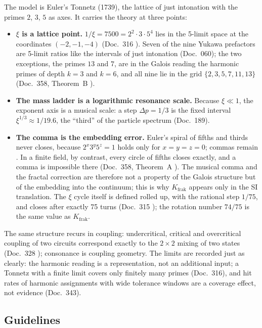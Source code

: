 The model is Euler's Tonnetz (1739), the lattice of just intonation with the primes $2$, $3$, $5$
as axes. It carries the theory at three points:
\begin{itemize}[leftmargin=*,itemsep=2pt]
\item \textbf{$\xi$ is a lattice point.} $1/\xi=7500=2^2\cdot3\cdot5^4$ lies in the 5-limit space
  at the coordinates $(-2,-1,-4)$ (Doc.~316 \KM). Seven of the nine Yukawa prefactors are 5-limit
  ratios like the intervals of just intonation (Doc.~060); the two exceptions, the primes $13$
  and $7$, are in the Galois reading the harmonic primes of depth $k=3$ and $k=6$, and all nine
  lie in the grid $\{2,3,5,7,11,13\}$ (Doc.~358, Theorem~B \BM).
\item \textbf{The mass ladder is a logarithmic resonance scale.} Because $\xi\ll1$, the exponent
  axis is a musical scale: a step $\Delta p=1/3$ is the fixed interval $\xi^{1/3}\approx1/19.6$,
  the ``third'' of the particle spectrum (Doc.~189).
\item \textbf{The comma is the embedding error.} Euler's spiral of fifths and thirds never
  closes, because $2^x3^y5^z=1$ holds only for $x=y=z=0$; commas remain \QM. In a finite field,
  by contrast, every circle of fifths closes exactly, and a comma is impossible there (Doc.~358,
  Theorem~A \BM). The musical comma and the fractal correction are therefore not a property of
  the Galois structure but of the embedding into the continuum; this is why $K_{\text{frak}}$
  appears only in the SI translation. The $\xi$ cycle itself is defined rolled up, with the
  rational step $1/75$, and closes after exactly 75 turns (Doc.~315 \BM); the rotation number
  $74/75$ is the same value as $K_{\text{frak}}$.
\end{itemize}
The same structure recurs in coupling: undercritical, critical and overcritical coupling of two
circuits correspond exactly to the $2\times2$ mixing of two states (Doc.~328 \BM); consonance is
coupling geometry. The limits are recorded just as clearly: the harmonic reading is a
representation, not an additional input; a Tonnetz with a finite limit covers only finitely many
primes (Doc.~316), and hit rates of harmonic assignments with wide tolerance windows are a
coverage effect, not evidence (Doc.~343).

\subsection{Guidelines}

